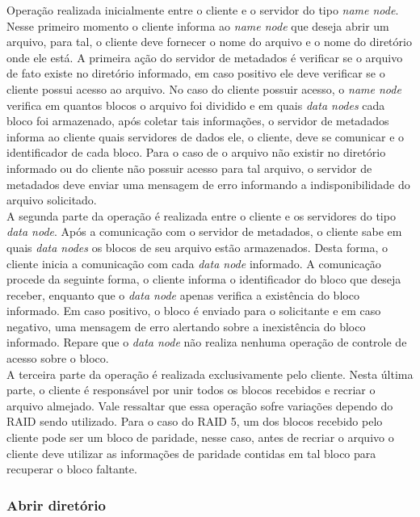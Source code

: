Operação realizada inicialmente entre o cliente e o servidor do tipo \textit{name node}. Nesse primeiro momento o cliente informa ao \textit{name node} que deseja abrir um arquivo, para tal, o cliente deve fornecer o nome do arquivo e o nome do diretório onde ele está. A primeira ação do servidor de metadados é verificar se o arquivo de fato existe no diretório informado, em caso positivo ele deve verificar se o cliente possui acesso ao arquivo. No caso do cliente possuir acesso, o \textit{name node} verifica em quantos blocos o arquivo foi dividido e em quais \textit{data nodes} cada bloco foi armazenado, após coletar tais informações, o servidor de metadados informa ao cliente quais servidores de dados ele, o cliente, deve se comunicar e o identificador de cada bloco. Para o caso de o arquivo não existir no diretório informado ou do cliente não possuir acesso para tal arquivo, o servidor de metadados deve enviar uma mensagem de erro informando a indisponibilidade do arquivo solicitado. 
\\

A segunda parte da operação é realizada entre o cliente e os servidores do tipo \textit{data node}. Após a comunicação com o servidor de metadados, o cliente sabe em quais \textit{data nodes} os blocos de seu arquivo estão armazenados. Desta forma, o cliente inicia a comunicação com cada \textit{data node} informado. A comunicação procede da seguinte forma, o cliente informa o identificador do bloco que deseja receber, enquanto que o \textit{data node} apenas verifica a existência do bloco informado. Em caso positivo, o bloco é enviado para o solicitante e em caso negativo, uma mensagem de erro alertando sobre a inexistência do bloco informado. Repare que o \textit{data node} não realiza nenhuma operação de controle de acesso sobre o bloco.
\\

A terceira parte da operação é realizada exclusivamente pelo cliente. Nesta última parte, o cliente é responsável por unir todos os blocos recebidos e recriar o arquivo almejado.  Vale ressaltar que essa operação sofre variações dependo do RAID sendo utilizado. Para o caso do RAID 5, um dos blocos recebido pelo cliente pode ser um bloco de paridade, nesse caso, antes de recriar o arquivo o cliente deve utilizar as informações de paridade contidas em tal bloco para recuperar o bloco faltante.
\\

\subsubsection{Abrir diretório}


